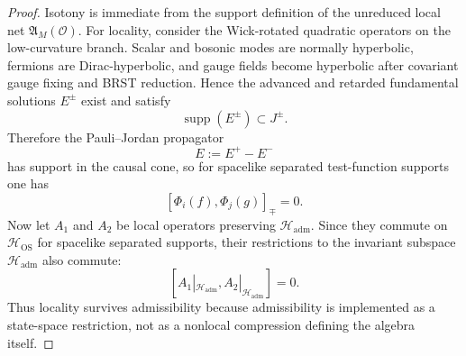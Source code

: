 \begin{proof}
Isotony is immediate from the support definition of the unreduced local net
$\mathfrak A_M(\mathcal O)$. For locality, consider the Wick-rotated quadratic operators on the
low-curvature branch. Scalar and bosonic modes are normally hyperbolic, fermions are
Dirac-hyperbolic, and gauge fields become hyperbolic after covariant gauge fixing and BRST
reduction. Hence the advanced and retarded fundamental solutions $E^\pm$ exist and satisfy
\[
\operatorname{supp}(E^\pm)\subset J^\pm.
\]
Therefore the Pauli--Jordan propagator
\[
E:=E^+-E^-
\]
has support in the causal cone, so for spacelike separated test-function supports one has
\[
[\Phi_i(f),\Phi_j(g)]_{\mp}=0.
\]
Now let $A_1$ and $A_2$ be local operators preserving $\mathcal H_{\mathrm{adm}}$. Since they
commute on $\mathcal H_{\mathrm{OS}}$ for spacelike separated supports, their restrictions to the
invariant subspace $\mathcal H_{\mathrm{adm}}$ also commute:
\[
[A_1|_{\mathcal H_{\mathrm{adm}}},A_2|_{\mathcal H_{\mathrm{adm}}}]=0.
\]
Thus locality survives admissibility because admissibility is implemented as a state-space
restriction, not as a nonlocal compression defining the algebra itself.
\end{proof}

